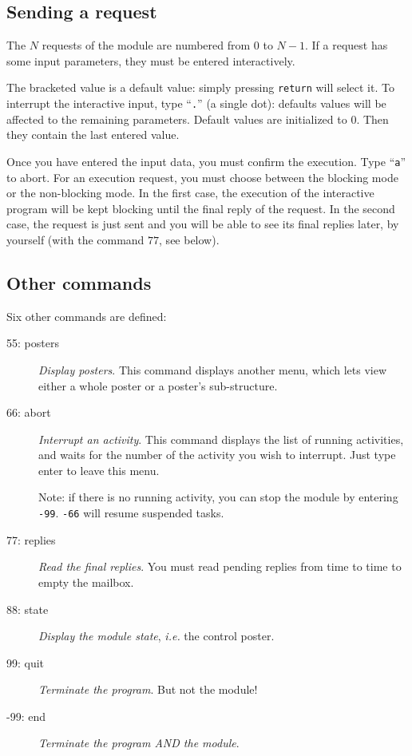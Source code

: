 \subsection{Sending a request}

The $N$ requests of the module are numbered from $0$ to $N-1$. If a
request has some input parameters, they must be entered interactively.

The bracketed value is a default value: simply pressing {\tt return} will
select  it.  To  interrupt the interactive  input,  type  ``{\tt .}''  (a
single   dot):   defaults  values  will   be  affected   to the remaining
parameters. Default values are initialized to $0$.  Then they contain the
last entered value.

Once    you  have  entered  the   input   data, you    must  confirm  the
execution. Type ``{\tt a}'' to abort.  For an execution request, you must
choose between  the blocking mode or the  non-blocking mode. In the first
case,  the execution  of  the interactive program  will be  kept blocking
until the final reply of the request.  In the second case, the request is
just sent and  you  will be  able to  see   its final replies   later, by
yourself (with the command $77$, see below).


\subsection{Other commands}

Six other commands are defined:

\begin{description}
\item[55: posters] {\em Display posters}. This command displays another
menu, which lets view either a whole poster or a poster's sub-structure.

\item[66: abort] {\em Interrupt an activity}. This command displays the
list of running activities, and waits for the number of the activity you
wish to interrupt. Just type enter to leave this menu.

Note: if there is no running activity, you can stop the module by
entering {\tt -99}. {\tt -66} will resume suspended tasks.

\item[77: replies] {\em Read the final replies}. You must read pending
replies from time to time to empty the mailbox.

\item[88: state] {\em Display the module state}, {\em i.e.} the control
poster.

\item[99: quit] {\em Terminate the program}. But not the module!

\item[-99: end] {\em Terminate the program AND the module}.
\end{description}



